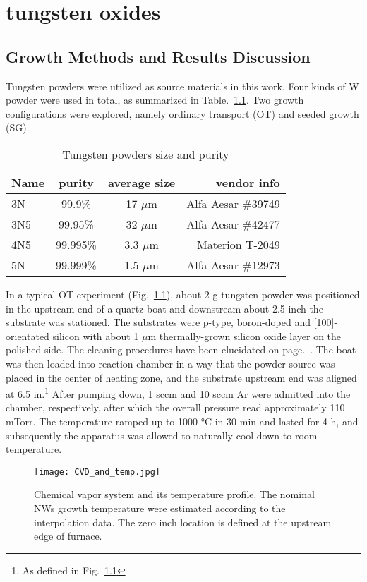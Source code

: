 
\chapter{tungsten oxides}

 


\section{Growth Methods and Results Discussion}

Tungsten powders were utilized as source materials in this work. Four kinds of W powder were used in total, as summarized in Table.~\ref{tab:powder}. Two growth configurations were explored, namely ordinary transport (OT) and seeded growth (SG).
\begin{table}[htb]
\centering
\caption{Tungsten powders size and purity}\label{tab:powder}
\begin{tabular}{lccr}
\toprule
Name & purity & average size & vendor info\\
\midrule
3N   &  99.9\% & 17 $\mu$m & Alfa Aesar \#39749\\
3N5   &  99.95\% & 32 $\mu$m  & Alfa Aesar \#42477\\
4N5   &  99.995\% & 3.3 $\mu$m  & Materion T-2049 \\
5N   &  99.999\% & 1.5 $\mu$m & Alfa Aesar \#12973\\
\bottomrule
\end{tabular}
\end{table}

In a typical OT experiment (Fig.~\ref{fig:wogrow}), about 2 g tungsten powder was positioned in the upstream end of a quartz boat and downstream about 2.5 inch the substrate was stationed. The substrates were p-type, boron-doped and [100]-orientated silicon with about 1 $\mu$m thermally-grown silicon oxide layer on the polished side. The cleaning procedures have been elucidated on page.~\pageref{ch2sub}. The boat was then loaded into reaction chamber in a way that the powder source was placed in the center of heating zone, and the substrate upstream end was aligned at 6.5 in.\footnote{As defined in Fig.~\ref{fig:wogrow}} After pumping down, 1 sccm  and 10 sccm Ar were admitted into the chamber, respectively, after which the overall pressure read approximately 110 mTorr. The temperature ramped up to 1000 \si{\degreeCelsius} in 30 min and lasted for 4 h, and subsequently the apparatus was allowed to naturally cool down to room temperature.
\begin{figure}[htb]
\centering
\texttt{[image: CVD\_and\_temp.jpg]}
\caption[ NW growth: OT]{Chemical vapor system and its temperature profile. The nominal NWs growth temperature were estimated according to the interpolation data. The zero inch location is defined at the upstream edge of furnace.}
\label{fig:wogrow}
\end{figure}


